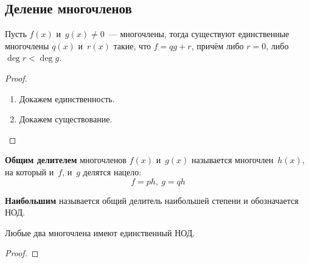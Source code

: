 \subsection{Деление многочленов}
\begin{theorem}
Пусть $f(x)$ и~$g(x) \neq 0$~--- многочлены, тогда существуют единственные многочлены $q(x)$ и~$r(x)$ такие, что $f = qg + r$, причём либо $r = 0$, либо $\deg r < \deg g$.
\end{theorem}
\begin{proof}
\begin{enumerate}
	\item Докажем единственность.
	
	\item Докажем существование.
	
\end{enumerate}
\end{proof}

\textbf{Общим делителем} многочленов $f(x)$ и~$g(x)$ называется многочлен~$h(x)$, на который и~$f$, и~$g$ делятся нацело:
\begin{equation*}
f = ph, \ g = qh
\end{equation*}

\textbf{Наибольшим} называется общий делитель наибольшей степени и обозначается НОД.

\begin{theorem}
Любые два многочлена имеют единственный НОД.
\end{theorem}
\begin{proof}

\end{proof}